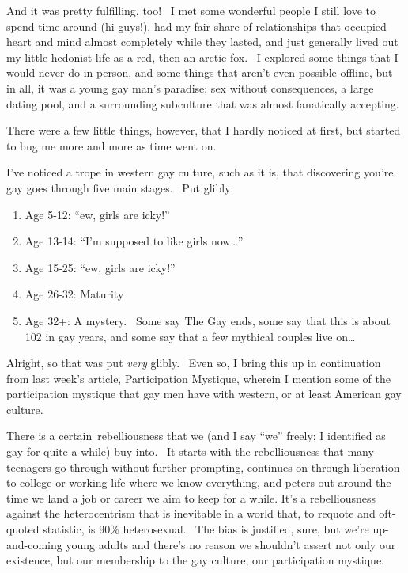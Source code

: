 And it was pretty fulfilling, too! ~I met some wonderful people I still
love to spend time around (hi guys!), had my fair share of relationships
that occupied heart and mind almost completely while they lasted, and
just generally lived out my little hedonist life as a red, then an
arctic fox. ~I explored some things that I would never do in person, and
some things that aren't even possible offline, but in all, it was a
young gay man's paradise; sex without consequences, a large dating pool,
and a surrounding subculture that was almost fanatically accepting.

There were a few little things, however, that I hardly noticed at first,
but started to bug me more and more as time went on.

I've noticed a trope in western gay culture, such as it is, that
discovering you're gay goes through five main stages. ~Put glibly:

\begin{enumerate}
\def\labelenumi{\arabic{enumi}.}
\tightlist
\item
  Age 5-12: ``ew, girls are icky!''
\item
  Age 13-14: ``I'm supposed to like girls now\ldots{}''
\item
  Age 15-25: ``ew, girls are icky!''
\item
  Age 26-32: Maturity
\item
  Age 32+: A mystery. ~Some say The Gay ends, some say that this is
  about 102 in gay years, and some say that a few mythical couples live
  on\ldots{}
\end{enumerate}

Alright, so that was put \emph{very} glibly. ~Even so, I bring this up
in continuation from last week's article, Participation Mystique,
wherein I mention some of the participation mystique that gay men have
with western, or at least American gay culture.

There is a certain~rebelliousness that we (and I say ``we'' freely; I
identified as gay for quite a while) buy into. ~It starts with the
rebelliousness that many teenagers go through without further prompting,
continues on through liberation to college or working life where we know
everything, and peters out around the time we land a job or career we
aim to keep for a while. It's a rebelliousness against the
heterocentrism that is inevitable in a world that, to requote and
oft-quoted statistic, is 90\% heterosexual. ~The bias is justified,
sure, but we're up-and-coming young adults and there's no reason we
shouldn't assert not only our existence, but our membership to the gay
culture, our participation mystique.

